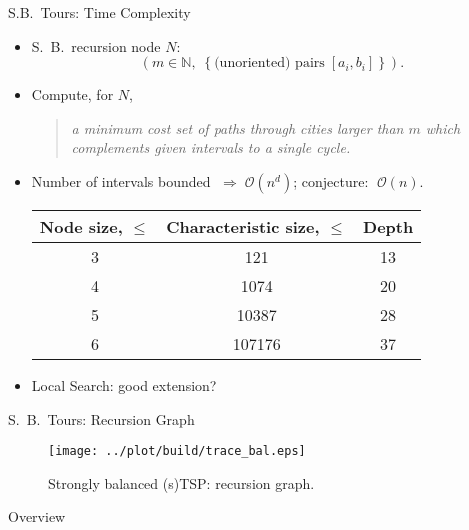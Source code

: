 \documentclass[
  size=10pt,
  style=klope,
  paper=screen,
  pauseslide,
  nopagebreaks,
  hlsections,
  fleqn
]{powerdot}
\begin{document}
\begin{slide}[toc=]{S.B.\ Tours: Time Complexity}
  \begin{itemize}
  \item
    S.\ B.\ recursion node $N$:
    \begin{equation}
    \left(m \in \mathbb{N}, \;
      \left\{ \text{(unoriented) pairs} \; [a_i,b_i] \right\} \right).
    \end{equation}
    \vspace{-5mm}
  \item
    Compute, for $N$,
    \begin{quote}
    {\small \itshape
      a minimum cost set of paths through cities larger than $m$
      which complements given intervals to a single cycle.
    }
    \end{quote}
  \item
    Number of intervals bounded $\;\Rightarrow\; \mathcal{O}\left(n^d\right)$;
    conjecture: $\;\mathcal{O}\left(n\right)$. %
    {\small
    \begin{table}[htpb]
    \centering
    \begin{tabular}{cSc}
      \toprule
      {\bfseries Node size, $\leq$ } &
      {\bfseries Characteristic size, $\leq$} &
      {\bfseries Depth } \\
      \midrule
      3 &    121 & 13 \\
      4 &   1074 & 20 \\
      5 &  10387 & 28 \\
      6 & 107176 & 37 \\
      \bottomrule
    \end{tabular}
    \end{table}
    }
  \item
  Local Search: good extension?
  \end{itemize}
\end{slide}

\begin{slide}[toc=]{S.\ B.\ Tours: Recursion Graph}
  \begin{figure}[H]
    \centering
    \texttt{[image: ../plot/build/trace\_bal.eps]}
    \caption{Strongly balanced (s)TSP: recursion graph.}
  \end{figure}
\end{slide}

\begin{slide}[toc=,bm=]{Overview}
\tableofcontents[content=currentsection,type=1]
\end{slide}
\end{document}
